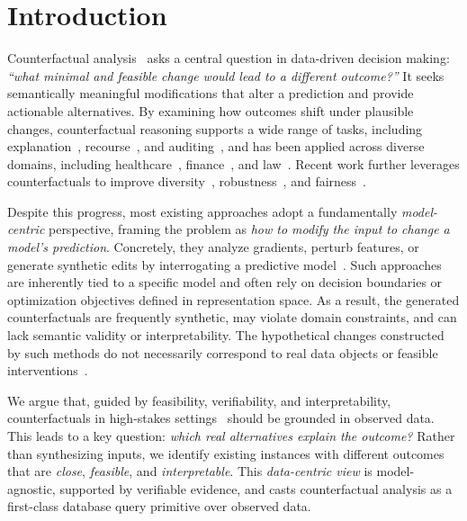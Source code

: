 \section{Introduction}\label{sec:intro}
Counterfactual analysis~\cite{wachter2017counterfactual,mothilal2020explaining} asks a central question in data-driven decision making: \textit{``what minimal and feasible change would lead to a different outcome?''} It seeks semantically meaningful modifications that alter a prediction and provide actionable alternatives. 
By examining how outcomes shift under plausible changes, counterfactual reasoning supports a wide range of tasks, including explanation~\cite{dandl2020multi}, recourse~\cite{karimi2021algorithmic}, and auditing~\cite{lee2021auditing}, and has been applied across diverse domains, including healthcare~\cite{abrate2021counterfactual}, finance~\cite{yang2021exploring}, and law~\cite{zhang2023cfgl}.
Recent work further leverages counterfactuals to improve diversity~\cite{mothilal2020explaining}, robustness~\cite{dominguez2022adversarial}, and fairness~\cite{von2022fairness}.

Despite this progress, most existing approaches adopt a fundamentally \emph{model-centric} perspective, framing the problem as \emph{how to modify the input to change a model's prediction}. Concretely, they analyze gradients, perturb features, or generate synthetic edits by interrogating a predictive model~\cite{bjoru2026framework,mothilal2020explaining,dandl2020multi,pawelczyk2020learning,kanamori2020dace,lucic2021focus,vanlooveren2020interpretable,galhotra2021explaining,schleich2021geco,kavouras2023fairness}. Such approaches are inherently tied to a specific model and often rely on decision boundaries or optimization objectives defined in representation space. As a result, the generated counterfactuals are frequently synthetic, may violate domain constraints, and can lack semantic validity or interpretability. The hypothetical changes constructed by such methods do not necessarily correspond to real data objects or feasible interventions~\cite{delaney2021uncertaintyestimationoutofdistributiondetection, mahajan2019preserving}.

We argue that, guided by feasibility, verifiability, and interpretability, counterfactuals in high-stakes settings~\cite{abrate2021counterfactual,yang2021exploring,lee2021auditing} should be grounded in observed data. This leads to a key question: \emph{which real alternatives explain the outcome?} Rather than synthesizing inputs, we identify existing instances with different outcomes that are \emph{close}, \emph{feasible}, and \emph{interpretable}. This \emph{data-centric view} is model-agnostic, supported by verifiable evidence, and casts counterfactual analysis as a first-class database query primitive over observed data.

